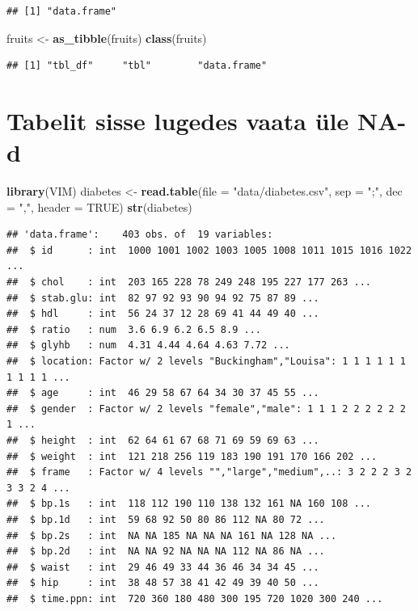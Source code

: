\documentclass[]{book}
\newenvironment{Shaded}{\begin{snugshade}}{\end{snugshade}}
\newcommand{\KeywordTok}[1]{\textcolor[rgb]{0.13,0.29,0.53}{\textbf{#1}}}
\newcommand{\DataTypeTok}[1]{\textcolor[rgb]{0.13,0.29,0.53}{#1}}
\newcommand{\StringTok}[1]{\textcolor[rgb]{0.31,0.60,0.02}{#1}}
\newcommand{\OtherTok}[1]{\textcolor[rgb]{0.56,0.35,0.01}{#1}}
\newcommand{\NormalTok}[1]{#1}
\begin{document}
\begin{verbatim}
## [1] "data.frame"
\end{verbatim}

\begin{Shaded}
\begin{Highlighting}[]
\NormalTok{fruits <-}\StringTok{ }\KeywordTok{as_tibble}\NormalTok{(fruits)}
\KeywordTok{class}\NormalTok{(fruits)}
\end{Highlighting}
\end{Shaded}

\begin{verbatim}
## [1] "tbl_df"     "tbl"        "data.frame"
\end{verbatim}

\section{Tabelit sisse lugedes vaata üle
NA-d}\label{tabelit-sisse-lugedes-vaata-ule-na-d}

\begin{Shaded}
\begin{Highlighting}[]
\KeywordTok{library}\NormalTok{(VIM) }
\NormalTok{diabetes <-}\StringTok{ }\KeywordTok{read.table}\NormalTok{(}\DataTypeTok{file =} \StringTok{"data/diabetes.csv"}\NormalTok{, }\DataTypeTok{sep =} \StringTok{";"}\NormalTok{, }\DataTypeTok{dec =} \StringTok{","}\NormalTok{, }\DataTypeTok{header =} \OtherTok{TRUE}\NormalTok{)}
\KeywordTok{str}\NormalTok{(diabetes)}
\end{Highlighting}
\end{Shaded}

\begin{verbatim}
## 'data.frame':    403 obs. of  19 variables:
##  $ id      : int  1000 1001 1002 1003 1005 1008 1011 1015 1016 1022 ...
##  $ chol    : int  203 165 228 78 249 248 195 227 177 263 ...
##  $ stab.glu: int  82 97 92 93 90 94 92 75 87 89 ...
##  $ hdl     : int  56 24 37 12 28 69 41 44 49 40 ...
##  $ ratio   : num  3.6 6.9 6.2 6.5 8.9 ...
##  $ glyhb   : num  4.31 4.44 4.64 4.63 7.72 ...
##  $ location: Factor w/ 2 levels "Buckingham","Louisa": 1 1 1 1 1 1 1 1 1 1 ...
##  $ age     : int  46 29 58 67 64 34 30 37 45 55 ...
##  $ gender  : Factor w/ 2 levels "female","male": 1 1 1 2 2 2 2 2 2 1 ...
##  $ height  : int  62 64 61 67 68 71 69 59 69 63 ...
##  $ weight  : int  121 218 256 119 183 190 191 170 166 202 ...
##  $ frame   : Factor w/ 4 levels "","large","medium",..: 3 2 2 2 3 2 3 3 2 4 ...
##  $ bp.1s   : int  118 112 190 110 138 132 161 NA 160 108 ...
##  $ bp.1d   : int  59 68 92 50 80 86 112 NA 80 72 ...
##  $ bp.2s   : int  NA NA 185 NA NA NA 161 NA 128 NA ...
##  $ bp.2d   : int  NA NA 92 NA NA NA 112 NA 86 NA ...
##  $ waist   : int  29 46 49 33 44 36 46 34 34 45 ...
##  $ hip     : int  38 48 57 38 41 42 49 39 40 50 ...
##  $ time.ppn: int  720 360 180 480 300 195 720 1020 300 240 ...
\end{verbatim}
\end{document}
